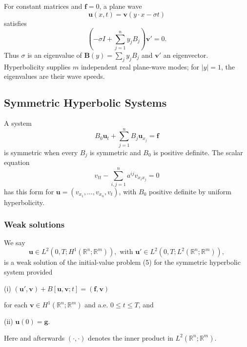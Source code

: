 \begin{remark}
\label{rem:motivation-hyperbolicity-plane-wave}
For constant matrices and $\mathbf f=0$, a plane wave
\[
\mathbf u(x,t)=\mathbf v(y\cdot x-\sigma t)
\tag{4}
\]
satisfies
\[
\left(-\sigma I+\sum_{j=1}^ny_jB_j\right)\mathbf v'=0.
\]
Thus $\sigma$ is an eigenvalue of $\mathbf B(y)=\sum_jy_jB_j$ and $\mathbf v'$ an eigenvector. Hyperbolicity supplies $m$ independent real plane-wave modes; for $|y|=1$, the eigenvalues are their wave speeds.
\end{remark}

\subsection{Symmetric Hyperbolic Systems}

\begin{remark}
\label{rem:symmetric-hyperbolic-general-systems}
A system
\[
B_0\mathbf u_t+\sum_{j=1}^nB_j\mathbf u_{x_j}=\mathbf f
\tag{9}
\]
is symmetric when every $B_j$ is symmetric and $B_0$ is positive definite. The scalar equation
\[
v_{tt}-\sum_{i,j=1}^na^{ij}v_{x_ix_j}=0
\tag{10}
\]
has this form for $\mathbf u=(v_{x_1},\ldots,v_{x_n},v_t)$, with $B_0$ positive definite by uniform hyperbolicity.
\end{remark}

\subsubsection{Weak solutions}

\begin{definition}
\label{def:weak-solution-symmetric-hyperbolic-system}
We say
\[
\mathbf{u} \in L^2(0,T; H^1(\mathbb{R}^n; \mathbb{R}^m)), \text{ with } \mathbf{u}' \in L^2(0,T; L^2(\mathbb{R}^n; \mathbb{R}^m)),
\]
is a weak solution of the initial-value problem (5) for the symmetric hyperbolic system provided

(i) $(\mathbf{u}',\mathbf{v}) + B[\mathbf{u},\mathbf{v};t] = (\mathbf{f},\mathbf{v})$

for each $\mathbf{v} \in H^1(\mathbb{R}^n; \mathbb{R}^m)$ and a.e. $0 \le t \le T$, and

(ii) $\mathbf{u}(0) = \mathbf{g}$.

Here and afterwards $(\cdot, \cdot)$ denotes the inner product in $L^2(\mathbb{R}^n; \mathbb{R}^m)$.
\end{definition}

